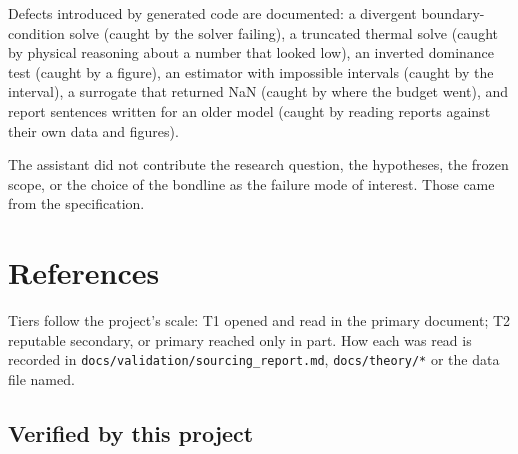 \documentclass[
  a4paper,
  11pt]{article}
\newcommand{\tierok}{{\color{good}\ding{51}}}
\newcommand{\tiermid}{{\color{warn}\ding{108}}}
\begin{document}
Defects introduced by generated code are documented: a divergent
boundary-condition solve (caught by the solver failing), a truncated
thermal solve (caught by physical reasoning about a number that looked
low), an inverted dominance test (caught by a figure), an estimator with
impossible intervals (caught by the interval), a surrogate that returned
NaN (caught by where the budget went), and report sentences written for
an older model (caught by reading reports against their own data and
figures).

The assistant did not contribute the research question, the hypotheses,
the frozen scope, or the choice of the bondline as the failure mode of
interest. Those came from the specification.

\FloatBarrier

\section{References}

Tiers follow the project's scale: \tierok{} T1 opened and read in the
primary document; \tiermid{} T2 reputable secondary, or primary reached
only in part. How each was read is recorded in
\texttt{docs/\allowbreak{}validation/\allowbreak{}sourcing\_\allowbreak{}report.md},
\texttt{docs/\allowbreak{}theory/\allowbreak{}*} or the data file named.

\subsection*{Verified by this project}\label{verified-by-this-project}
\end{document}
